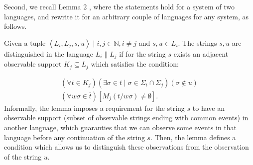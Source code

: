 \documentclass[a4paper, 10pt, conference]{ieeeconf}
\begin{document}
Second, we recall Lemma 2 \cite{myadzelets_virtual_2013}, where the statements
hold for a system of two languages, and rewrite it for an arbitrary couple
of languages for any system, as follows.

\begin{lemma}
\label{lem:distinguished}
Given a tuple $\left< L_i, L_j, s, u\right> \mid i, j \in \mathbb{N}, i\neq j$
and $s, u \in L_i$. The strings $s, u$ are
distinguished in the language $L_i \parallel L_j$ if for the string $s$ exists
an adjacent observable support $K_j \subseteq L_j$ which satisfies the
condition:
\end{lemma} 
\begin{equation}
\label{con:distinquished}
	\begin{array}{l}
	 	(\forall t \in K_j)
	 	(\exists \sigma \in t \mid \sigma \in \Sigma_i \cap \Sigma_j)
	 	(\sigma \not \in u)
	 	\\
	 	(\forall w\sigma \in \overline{t})
	 	[M_j(t / w\sigma) \neq \emptyset].
	\end{array}
\end{equation}
Informally, the lemma imposes a requirement for the string $s$ to have an
observable support (subset of observable strings ending with common events) in
another language, which guaranties that we can observe some events in that
language before any continuation of the string $s$.
Then, the lemma defines a condition which allows us to distinguish these
observations from the observation of the string $u$.
\end{document}
